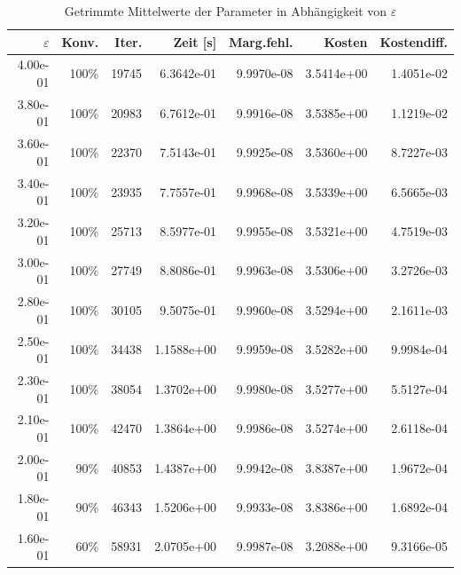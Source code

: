 \begin{table}[htbp]
\caption{Getrimmte Mittelwerte der Parameter in Abhängigkeit von $\varepsilon$}
\label{tab:Parametertest256_2}
\small
\centering
{}
\begin{tabular}{rrrrrrr}
\toprule
$\varepsilon$ & Konv. & Iter. & Zeit [s] & Marg.fehl. & Kosten & Kostendiff. \\
\midrule
4.00e-01 & 100\% & 19745 & 6.3642e-01 & 9.9970e-08 & 3.5414e+00 & 1.4051e-02 \\
3.80e-01 & 100\% & 20983 & 6.7612e-01 & 9.9916e-08 & 3.5385e+00 & 1.1219e-02 \\
3.60e-01 & 100\% & 22370 & 7.5143e-01 & 9.9925e-08 & 3.5360e+00 & 8.7227e-03 \\
3.40e-01 & 100\% & 23935 & 7.7557e-01 & 9.9968e-08 & 3.5339e+00 & 6.5665e-03 \\
3.20e-01 & 100\% & 25713 & 8.5977e-01 & 9.9955e-08 & 3.5321e+00 & 4.7519e-03 \\
3.00e-01 & 100\% & 27749 & 8.8086e-01 & 9.9963e-08 & 3.5306e+00 & 3.2726e-03 \\
2.80e-01 & 100\% & 30105 & 9.5075e-01 & 9.9960e-08 & 3.5294e+00 & 2.1611e-03 \\
2.50e-01 & 100\% & 34438 & 1.1588e+00 & 9.9959e-08 & 3.5282e+00 & 9.9984e-04 \\
2.30e-01 & 100\% & 38054 & 1.3702e+00 & 9.9980e-08 & 3.5277e+00 & 5.5127e-04 \\
2.10e-01 & 100\% & 42470 & 1.3864e+00 & 9.9986e-08 & 3.5274e+00 & 2.6118e-04 \\
2.00e-01 & 90\% & 40853 & 1.4387e+00 & 9.9942e-08 & 3.8387e+00 & 1.9672e-04 \\
1.80e-01 & 90\% & 46343 & 1.5206e+00 & 9.9933e-08 & 3.8386e+00 & 1.6892e-04 \\
1.60e-01 & 60\% & 58931 & 2.0705e+00 & 9.9987e-08 & 3.2088e+00 & 9.3166e-05 \\
\bottomrule
\end{tabular}
\end{table}
